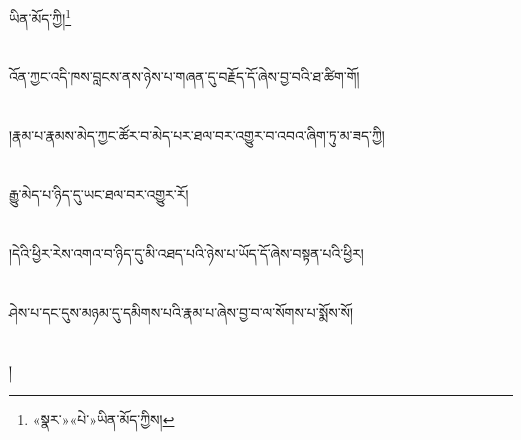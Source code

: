 ཡིན་མོད་ཀྱི།\footnote{«སྣར་»«པེ་»ཡིན་མོད་ཀྱིས།}\chapter{ }འོན་ཀྱང་འདི་ཁས་བླངས་ནས་ཉེས་པ་གཞན་དུ་བརྗོད་དོ་ཞེས་བྱ་བའི་ཐ་ཚིག་གོ།\chapter{ }།རྣམ་པ་རྣམས་མེད་ཀྱང་ཚོར་བ་མེད་པར་ཐལ་བར་འགྱུར་བ་འབའ་ཞིག་ཏུ་མ་ཟད་ཀྱི།\chapter{ }རྒྱུ་མེད་པ་ཉིད་དུ་ཡང་ཐལ་བར་འགྱུར་རོ།\chapter{ }།དེའི་ཕྱིར་རེས་འགའ་བ་ཉིད་དུ་མི་འཐད་པའི་ཉེས་པ་ཡོད་དོ་ཞེས་བསྟན་པའི་ཕྱིར།\chapter{ }ཤེས་པ་དང་དུས་མཉམ་དུ་དམིགས་པའི་རྣམ་པ་ཞེས་བྱ་བ་ལ་སོགས་པ་སྨོས་སོ།\chapter{ }།
